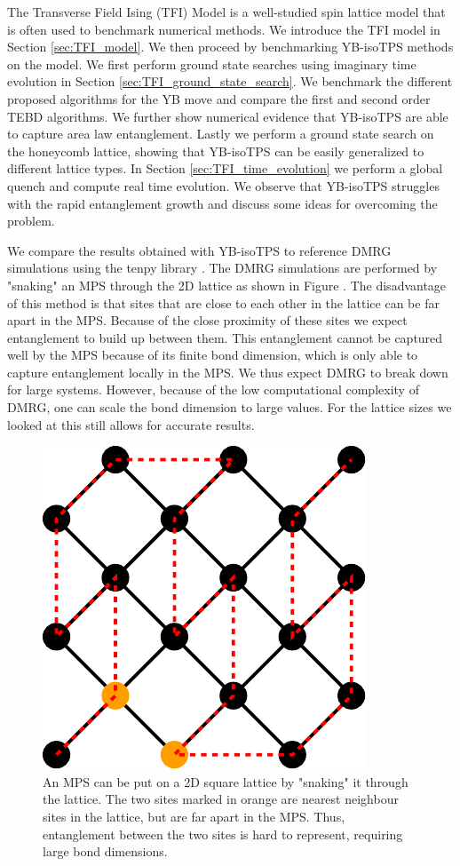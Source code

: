 The Transverse Field Ising (TFI) Model is a well-studied spin lattice model that is often used to benchmark numerical methods. We introduce the TFI model in Section \ref{sec:TFI_model}. We then proceed by benchmarking YB-isoTPS methods on the model. We first perform ground state searches using imaginary time evolution in Section \ref{sec:TFI_ground_state_search}. We benchmark the different proposed algorithms for the YB move and compare the first and second order TEBD algorithms. We further show numerical evidence that YB-isoTPS are able to capture area law entanglement. Lastly we perform a ground state search on the honeycomb lattice, showing that YB-isoTPS can be easily generalized to different lattice types. In Section \ref{sec:TFI_time_evolution} we perform a global quench and compute real time evolution. We observe that YB-isoTPS struggles with the rapid entanglement growth and discuss some ideas for overcoming the problem. \par
We compare the results obtained with YB-isoTPS to reference DMRG simulations using the tenpy library \cite{cite:tenpy}. The DMRG simulations are performed by "snaking" an MPS through the 2D lattice as shown in Figure . The disadvantage of this method is that sites that are close to each other in the lattice can be far apart in the MPS. Because of the close proximity of these sites we expect entanglement to build up between them. This entanglement cannot be captured well by the MPS because of its finite bond dimension, which is only able to capture entanglement locally in the MPS. We thus expect DMRG to break down for large systems. However, because of the low computational complexity of DMRG, one can scale the bond dimension to large values. For the lattice sizes we looked at this still allows for accurate results.
\begin{figure}
	\centering
	\includegraphics[scale=0.6]{figures/tikz/TFI/dmrg_snaking/dmrg_snaking.pdf}
	\caption{An MPS can be put on a 2D square lattice by "snaking" it through the lattice. The two sites marked in orange are nearest neighbour sites in the lattice, but are far apart in the MPS. Thus, entanglement between the two sites is hard to represent, requiring large bond dimensions.}
	\label{fig:tenpy_snaking}
\end{figure}

